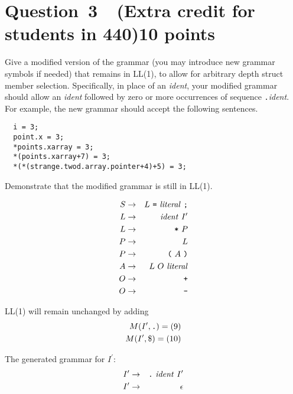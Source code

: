 \documentclass[10pt]{article}
\begin{document}
\section*{Question~3~~(Extra credit for students in 440)\hfill 10 points}

Give a modified version of the grammar
(you may introduce new grammar symbols if needed)
that remains in LL(1),
to allow for arbitrary depth struct member selection.
Specifically,
in place of an \emph{ident},
your modified grammar should allow
an \emph{ident} followed by zero or more
occurrences of sequence \verb|.|\emph{ident}.
For example, the new grammar should accept
the following sentences.
\begin{verbatim}
  i = 3;
  point.x = 3;
  *points.xarray = 3;
  *(points.xarray+7) = 3;
  *(*(strange.twod.array.pointer+4)+5) = 3;
\end{verbatim}
Demonstrate that the modified grammar is still in LL(1).
\begin{framed}
\begin{eqnarray*}
    S & \rightarrow & L ~ \verb|=| ~ \mathit{literal} ~ \verb|;| \\
    L & \rightarrow & \mathit{ident} ~ I^{\prime}
    \\
    L & \rightarrow & \verb|*| ~ P
    \\
    P & \rightarrow & L
    \\
    P & \rightarrow & \verb|(| ~ A ~ \verb|)|
    \\
    A & \rightarrow & L ~ O ~ \mathit{literal}
    \\
    O & \rightarrow & \verb|+|
    \\
    O & \rightarrow & \verb|-|
\end{eqnarray*}

LL(1) will remain unchanged by adding
\begin{eqnarray*}
M(I^\prime, \verb|.|) = (9) \\
M(I^\prime, \$) = (10)
\end{eqnarray*}


The generated grammar for $I^{\prime}$:
\begin{eqnarray*}
    I^{\prime} & \rightarrow & \verb|.| ~ \mathit{ident} ~ I^{\prime}
    \\
    I^{\prime} & \rightarrow & \epsilon
\end{eqnarray*}

\end{framed}
\end{document}
